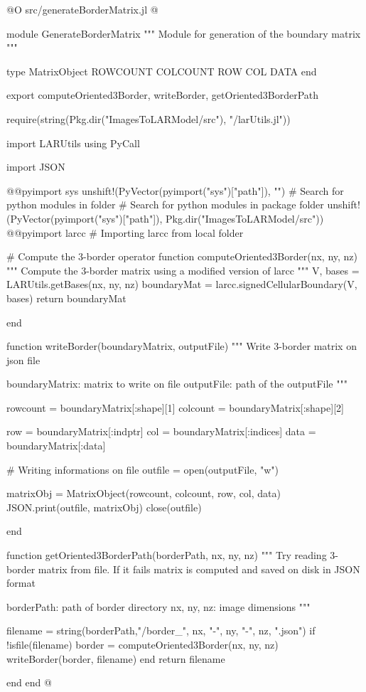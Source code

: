 \documentclass[11pt,oneside]{article}	%
\begin{document}
@O src/generateBorderMatrix.jl
@{module GenerateBorderMatrix
"""
Module for generation of the boundary matrix
"""

type MatrixObject
  ROWCOUNT
  COLCOUNT
  ROW
  COL
  DATA
end


export computeOriented3Border, writeBorder, getOriented3BorderPath

require(string(Pkg.dir("ImagesToLARModel/src"), "/larUtils.jl"))

import LARUtils
using PyCall

import JSON

@@pyimport sys
unshift!(PyVector(pyimport("sys")["path"]), "") # Search for python modules in folder
# Search for python modules in package folder
unshift!(PyVector(pyimport("sys")["path"]), Pkg.dir("ImagesToLARModel/src"))
@@pyimport larcc # Importing larcc from local folder

# Compute the 3-border operator
function computeOriented3Border(nx, ny, nz)
  """
  Compute the 3-border matrix using a modified
  version of larcc
  """
  V, bases = LARUtils.getBases(nx, ny, nz)
  boundaryMat = larcc.signedCellularBoundary(V, bases)
  return boundaryMat

end

function writeBorder(boundaryMatrix, outputFile)
  """
  Write 3-border matrix on json file

  boundaryMatrix: matrix to write on file
  outputFile: path of the outputFile
  """

  rowcount = boundaryMatrix[:shape][1]
  colcount = boundaryMatrix[:shape][2]

  row = boundaryMatrix[:indptr]
  col = boundaryMatrix[:indices]
  data = boundaryMatrix[:data]

  # Writing informations on file
  outfile = open(outputFile, "w")

  matrixObj = MatrixObject(rowcount, colcount, row, col, data)
  JSON.print(outfile, matrixObj)
  close(outfile)

end

function getOriented3BorderPath(borderPath, nx, ny, nz)
  """
  Try reading 3-border matrix from file. If it fails matrix
  is computed and saved on disk in JSON format

  borderPath: path of border directory
  nx, ny, nz: image dimensions
  """

  filename = string(borderPath,"/border_", nx, "-", ny, "-", nz, ".json")
  if !isfile(filename)
    border = computeOriented3Border(nx, ny, nz)
    writeBorder(border, filename)
  end
  return filename

end
end
@}
\end{document}
